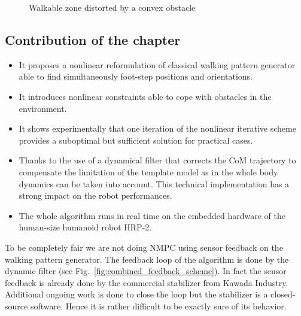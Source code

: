 \begin{figure}[ht]
    \centering
    
    \caption{Walkable zone distorted by a convex obstacle}
    \label{fig:algo_diff}
\end{figure}

\subsection{Contribution of the chapter}

\begin{itemize}
\item It proposes a nonlinear reformulation of classical walking pattern generator able to find simultaneously foot-step positions and orientations.
\item It introduces nonlinear constraints able to cope with obstacles in the environment.
\item It shows experimentally that one iteration of the nonlinear iterative scheme provides a suboptimal but sufficient solution for practical cases.
\item Thanks to the use of a dynamical filter that corrects the CoM trajectory to compensate the limitation of the template model as in \cite{Nishiwaki:IJRR:09}
the whole body dynamics can be taken into account. This technical implementation has a strong impact on the robot performances.
\item The whole algorithm runs in real time on the embedded hardware of the human-size humanoid robot HRP-2.
\end{itemize}
To be completely fair we are not doing NMPC using sensor feedback on the walking pattern generator.
The feedback loop of the algorithm is done by the dynamic filter (see Fig.~\ref{fig:combined_feedback_scheme}).
In fact the sensor feedback is already done by the commercial stabilizer from Kawada Industry.
Additional ongoing work is done to close the loop but the stabilizer is a closed-source software.
Hence it is rather difficult to be exactly sure of its behavior.

